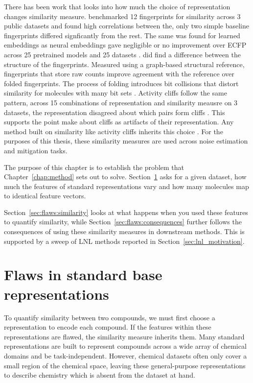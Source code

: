 There has been work that looks into how much the choice of representation changes similarity measure. \citet{Riniker2013} benchmarked 12 fingerprints for similarity across 3 public datasets and found high correlations between the, only two simple baseline fingerprints differed signficantly from the rest. The same was found for learned embeddings as neural embeddings gave negligible or no improvement over ECFP across 25 pretrained models and 25 datasets \citep{Praski2025}. \citet{Huber2026} did find a difference between the structure of the fingerprints. Measured using a graph-based structural reference, fingerprints that store raw counts improve agreement with the reference over folded fingerprints. The process of folding introduces bit collisions that distort similarity for molecules with many bit sets \citep{Huber2026}. Activity cliffs follow the same pattern, across 15 combinations of representation and similarity meausre on 3 datasets, the representation disagreed about which pairs form cliffs \citep{DabrowskiTumanski2026}. This supports the point \citet{MedinaFranco2013} make about cliffs as artifacts of their representation. Any method built on similarity like activity cliffs inherits this choice \citet{Wilson1972}. For the purposes of this thesis, these similarity measures are used across noise estimation and mitigation tasks. 

The purpose of this chapter is to establish the problem that Chapter~\ref{chap:method} sets out to solve. Section~\ref{sec:flaws:representations} asks for a given dataset, how much the features of standard representations vary and how many molecules map to identical feature vectors. 

Section~\ref{sec:flaws:similarity} looks at what happens when you used these features to quantify similarity, while Section~\ref{sec:flaws:consequences} further follows the consequences of using these similarity measures in downstream methods. This is supported by a sweep of LNL methods reported in Section~\ref{sec:lnl_motivation}.


\section{Flaws in standard base representations}\label{sec:flaws:representations} %

To quantify similarity between two compounds, we must first choose a representation to encode each compound. If the features within these representations are flawed, the similarity measure inherits them. Many standard representations are built to represent compounds across a wide array of chemical domains and be task-independent. However, chemical datasets often only cover a small region of the chemical space, leaving these general-purpose representations to describe chemistry which is absent from the dataset at hand. 

